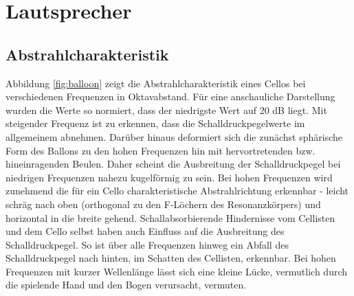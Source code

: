 \newcommand{\files}[1]{
    \hfill
    \mbox{
        $\hookrightarrow$
        \texttt{#1}
    }
}

\section{Lautsprecher}
\label{sec:1}

\subsection{Abstrahlcharakteristik}
\label{subsec:a}
Abbildung \ref{fig:balloon} zeigt die Abstrahlcharakteristik eines Cellos bei verschiedenen Frequenzen in Oktavabstand.
Für eine anschauliche Darstellung wurden die Werte so normiert, dass der niedrigste Wert auf 20 dB liegt.
Mit steigender Frequenz ist zu erkennen, dass die Schalldruckpegelwerte im allgemeinem abnehmen.
Darüber hinaus deformiert sich die zunächst sphärische Form des Ballons zu den hohen Frequenzen hin mit hervortretenden bzw. hineinragenden Beulen.
Daher scheint die Ausbreitung der Schalldruckpegel bei niedrigen Frequenzen nahezu kugelförmig zu sein.
Bei hohen Frequenzen wird zunehmend die für ein Cello charakteristische Abstrahlrichtung erkennbar - leicht schräg nach oben (orthogonal zu den F-Löchern des Resonanzkörpers) und horizontal in die breite gehend.
Schallabsorbierende Hindernisse vom Cellisten und dem Cello selbst haben auch Einfluss auf die Ausbreitung des Schalldruckpegel.
So ist über alle Frequenzen hinweg ein Abfall des Schalldruckpegel nach hinten, im Schatten des Cellisten, erkennbar.
Bei hohen Frequenzen mit kurzer Wellenlänge lässt sich eine kleine Lücke, vermutlich durch die spielende Hand und den Bogen verursacht, vermuten.


